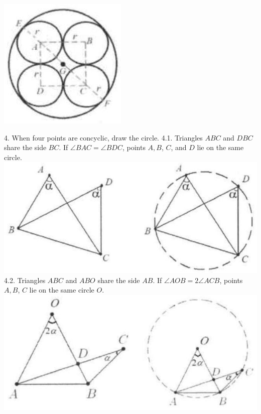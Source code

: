 \documentclass[10pt]{article}
\begin{document}
\includegraphics[max width=\textwidth, center]{2025_04_17_97bc1f7e44d93c271a88g-190}


4. When four points are concyclic, draw the circle.
4.1. Triangles \(A B C\) and \(D B C\) share the side \(B C\). If \(\angle B A C=\angle B D C\), points \(A, B\), \(C\), and \(D\) lie on the same circle.\\
\includegraphics[max width=\textwidth, center]{2025_04_17_97bc1f7e44d93c271a88g-191(3)}\\
4.2. Triangles \(A B C\) and \(A B O\) share the side \(A B\). If \(\angle A O B=2 \angle A C B\), points \(A, B\), \(C\) lie on the same circle \(O\).\\
\includegraphics[max width=\textwidth, center]{2025_04_17_97bc1f7e44d93c271a88g-191}
\end{document}
